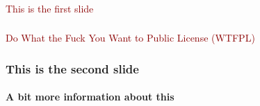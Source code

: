 \documentclass[c]{beamer}
\begin{document}
  \begin{frame}
    \frametitle{}
    \textcolor{darkred}{{\fontsize{60pt}{1em}\selectfont This is the first slide}}
  \end{frame}
  \begin{frame}
    \frametitle{}
    \textcolor{darkred}{{\fontsize{50pt}{1em}\selectfont Do What the Fuck You Want to Public License (WTFPL)}}
  \end{frame}
  \begin{frame}
    \frametitle{This is the second slide}
    \framesubtitle{A bit more information about this}
  \end{frame}
\end{document}
